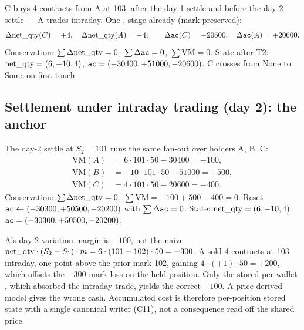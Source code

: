 C buys 4 contracts from A at 103, after the day-1 settle and before the day-2 settle --- A trades
intraday. One , stage already  (mark preserved):
\[
\Delta\mathrm{net\_qty}(C)=+4,\quad \Delta\mathrm{net\_qty}(A)=-4;\qquad
\Delta\texttt{ac}(C) = -20600,\quad \Delta\texttt{ac}(A) = +20600.
\]
Conservation: $\sum\Delta\mathrm{net\_qty}=0$, $\sum\Delta\texttt{ac}=0$, $\sum\mathrm{VM}=0$. State after T2:
$\mathrm{net\_qty}=(6,-10,4)$, $\texttt{ac}=(-30400,+51000,-20600)$. C crosses from $\mathrm{None}$ to $\mathrm{Some}$ on
first touch.

\subsection{Settlement under intraday trading (day 2): the anchor}
\label{sec:anchor}

{\raggedright
The day-2 settle at $S_2=101$ runs the same fan-out over holders A, B, C:
\[
\begin{aligned}
\mathrm{VM}(A) &= 6\cdot 101\cdot 50 - 30400 = -100,\\
\mathrm{VM}(B) &= -10\cdot 101\cdot 50 + 51000 = +500,\\
\mathrm{VM}(C) &= 4\cdot 101\cdot 50 - 20600 = -400.
\end{aligned}
\]
Conservation: $\sum\Delta\mathrm{net\_qty}=0$, $\sum\mathrm{VM} = -100+500-400 = 0$. Reset
$\texttt{ac}\leftarrow(-30300,+50500,-20200)$ with $\sum\Delta\texttt{ac}=0$. State: $\mathrm{net\_qty}=(6,-10,4)$,
$\texttt{ac}=(-30300,+50500,-20200)$.\par}

\begin{principle}
A's day-2 variation margin is $-100$, not the naive $\mathrm{net\_qty}\cdot(S_2-S_1)\cdot m =
6\cdot(101-102)\cdot 50 = -300$. A sold 4 contracts at 103 intraday, one point above the prior mark
102, gaining $4\cdot(+1)\cdot 50=+200$, which offsets the $-300$ mark loss on the held position. Only
the stored per-wallet \ac{}, which absorbed the intraday trade, yields the correct $-100$. A
price-derived model gives the wrong cash. Accumulated cost is therefore per-position stored state with
a single canonical writer (C11), not a consequence read off the shared price.
\end{principle}

